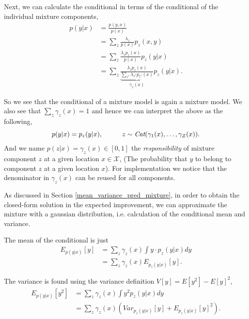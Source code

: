 Next, we can calculate the conditional in terms of the conditional of the individual mixture
components, 
\begin{align*}
    p(y|x) &= \frac{p(y,x)}{p(x)}\\
    &= \sum_{z} \frac{\lambda_z}{p(x)} p_z(x,y)\\
    &=  \sum_{z}  \frac{\lambda_z p_z(x)}{p(x)}p_z(y|x)\\
    &=  \sum_{z}  \underbrace{ \frac{\lambda_z p_z(x)}{\sum_{z^*} \lambda_{z^*} p_{z^*}(x)}}_{\gamma_z(x)} p_z(y|x).
\end{align*}

So we see that the conditional of a mixture model is again a mixture model. 
We also see that $\sum_z \gamma_z(x) = 1$ and hence we can interpret the above as the following, 
$$p(y|x) = p_z(y|x),  \hspace*{1cm} z \sim \textit{Cat}(\gamma_1(x), \dots, \gamma_Z(x)).$$ And we name
$p(z|x) = \gamma_z(x) \in [0,1]$ the \textit{responsibility} of mixture component $z$ at a given
location $x \in \mathcal{X}$, (The probability that $y$ to belong to component $z$ at a given
location $x$). For implementation we notice that the denominator in $\gamma_z(x)$ can be reused for
all components. 

\begin{testexample}
    As discussed in Section \ref{mean_variance_pred_mixture}, in order to obtain the closed-form
    solution in the expected improvement, we can approximate the  mixture with a gaussian distribution, 
    i.e. calculation of the conditional mean and variance. 

    The mean of the conditional is just
    \begin{align*}
        E_{p(y|x)}[y] &= \sum_{z} \gamma_z(x) \int y \cdot p_z(y|x)dy \\
        &= \sum_{z} \gamma_z(x) E_{ p_z(y|x)}[y].
    \end{align*}

    The variance is found using the variance definition $V[y] = E[y^2] - E[y]^2$, 
    \begin{align*}
        E_{p(y|x)}[y^2] &= \sum_{z} \gamma_z(x) \int  y^2 p_{z}(y|x) dy \\
        &= \sum_{z} \gamma_z(x) (Var_{ p_z(y|x)}[y]+E_{ p_z(y|x)}[y]^2).
    \end{align*}
\end{testexample}



